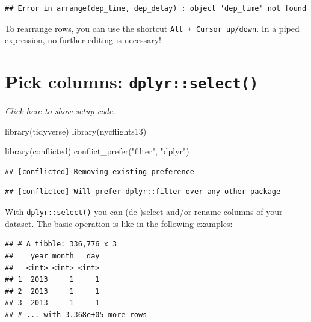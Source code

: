 \documentclass[]{book}
\newenvironment{Shaded}{}{}
\newcommand{\KeywordTok}[1]{\textcolor[rgb]{0.00,0.00,1.00}{#1}}
\newcommand{\NormalTok}[1]{#1}
\newcommand{\OperatorTok}[1]{#1}
\newcommand{\StringTok}[1]{\textcolor[rgb]{0.00,0.50,0.50}{#1}}
\begin{document}
\begin{verbatim}
## Error in arrange(dep_time, dep_delay) : object 'dep_time' not found
\end{verbatim}

To rearrange rows, you can use the shortcut \texttt{Alt\ +\ Cursor\ up/down}.
In a piped expression, no further editing is necessary!

\hypertarget{pick-columns-dplyrselect}{%
\section{\texorpdfstring{Pick columns: \texttt{dplyr::select()}}{Pick columns: dplyr::select()}}\label{pick-columns-dplyrselect}}

\emph{Click here to show setup code.}

\begin{Shaded}
\begin{Highlighting}[]
\KeywordTok{library}\NormalTok{(tidyverse)}
\KeywordTok{library}\NormalTok{(nycflights13)}

\KeywordTok{library}\NormalTok{(conflicted)}
\KeywordTok{conflict_prefer}\NormalTok{(}\StringTok{"filter"}\NormalTok{, }\StringTok{"dplyr"}\NormalTok{)}
\end{Highlighting}
\end{Shaded}

\begin{verbatim}
## [conflicted] Removing existing preference
\end{verbatim}

\begin{verbatim}
## [conflicted] Will prefer dplyr::filter over any other package
\end{verbatim}

With \texttt{dplyr::select()} you can (de-)select and/or rename columns of your dataset.
The basic operation is like in the following examples:

\begin{Shaded}
\end{Shaded}

\begin{verbatim}
## # A tibble: 336,776 x 3
##    year month   day
##   <int> <int> <int>
## 1  2013     1     1
## 2  2013     1     1
## 3  2013     1     1
## # ... with 3.368e+05 more rows
\end{verbatim}
\end{document}
